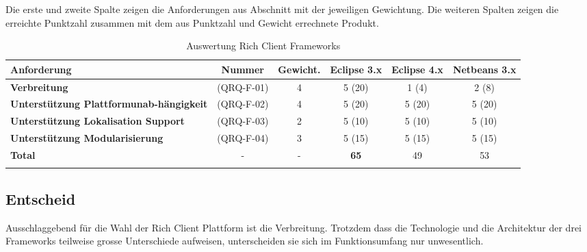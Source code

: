 Die erste und zweite Spalte zeigen die Anforderungen aus Abschnitt  mit der jeweiligen Gewichtung. Die weiteren Spalten zeigen die erreichte Punktzahl zusammen mit dem aus Punktzahl und Gewicht errechnete Produkt.
\begin{longtable}{|p{3cm}|c|c|c|c|c|}\hline
 \textbf{Anforderung} & \textbf{Nummer} &  \textbf{Gewicht.} & \textbf{Eclipse 3.x} & \textbf{Eclipse 4.x} &  \textbf{Netbeans 3.x}\\\hline
   \textbf{Verbreitung} & (QRQ-F-01) & 4 & 5 (20) & 1 (4) & 2 (8)\\\hline
   \textbf{Unterstützung Plattformunab-hängigkeit} & (QRQ-F-02) & 4 & 5 (20) & 5 (20) & 5 (20)\\\hline
   \textbf{Unterstützung Lokalisation Support} & (QRQ-F-03) & 2 & 5 (10) & 5 (10) & 5 (10) \\\hline
   \textbf{Unterstützung Modularisierung} & (QRQ-F-04) & 3 & 5 (15) & 5 (15) & 5 (15) \\\hline
   \textbf{Total} & - & - & \textbf{65} & 49 & 53\\\hline
    \caption{Auswertung Rich Client Frameworks}
\end{longtable}


\subsection{Entscheid}\label{rcp_entscheid}
Ausschlaggebend für die Wahl der Rich Client Plattform ist die Verbreitung. Trotzdem dass die Technologie und die Architektur der drei Frameworks teilweise grosse Unterschiede aufweisen, unterscheiden sie sich im Funktionsumfang nur unwesentlich. 

